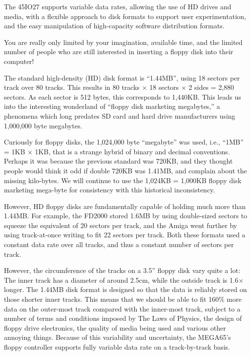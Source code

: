 The 45IO27 supports variable data rates, allowing the use of HD drives and media,
with a flexible approach to disk formats to support user experimentation, and the
easy manipulation of high-capacity software distribution formats.

You are really only limited by your imagination, available time, and
the limited number of people who are still interested in inserting a
floppy disk into their computer!

The standard high-density (HD) disk format is ``1.44MB'', using 18 sectors per track over 80 tracks.
This results in 80 tracks $\times$ 18 sectors $\times$ 2 sides = 2,880 sectors. As each sector
is 512 bytes, this corresponds to 1,440KB.  This leads us into the interesting wonderland of
``floppy disk marketing megabytes,'' a phenomena which long predates SD card and hard drive
manufacturers using 1,000,000 byte megabytes.

Curiously for floppy disks, the 1,024,000 byte ``megabyte'' was used, i.e., ``1MB'' = 1KB $\times$ 1KB,
that is a strange hybrid of binary and decimal conventions.  Perhaps it was because the previous standard
was 720KB, and they thought people would think it odd if double 720KB was 1.41MB, and complain about the
missing kilo-bytes.  We will continue to use the 1,024KB = 1,000KB floppy disk marketing mega-byte for
consistency with this historical inconsistency.

However, HD floppy disks are fundamentally capable of holding much more than 1.44MB. For example, the FD2000
stored 1.6MB by using double-sized sectors to squeeze the equivalent of 20 sectors per track, and the Amiga
went further by using track-at-once writing to fit 22 sectors per track. Both these formats used a constant
data rate over all tracks, and thus a constant number of sectors per track.

However, the circumference of the tracks on a 3.5'' floppy disk vary quite a lot: The inner track has a diameter
of around 2.5cm, while the outside track is 1.6$\times$ longer.
The 1.44MB disk format is designed so that
the data is reliably stored on those shorter inner tracks.
This means that we should be able to fit 160\%
more data on the outer-most track compared with the inner-most track, subject to a number of terms and conditions
imposed by The Laws of Physics, the design of floppy drive electronics, the quality of media being used and
various other annoying things.
Because of this variability and uncertainty, the MEGA65's floppy controller supports fully variable data rate
on a track-by-track basis.

